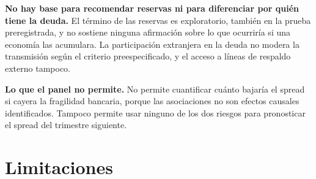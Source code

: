 \textbf{No hay base para recomendar reservas ni para diferenciar por quién tiene la deuda.} El término de las reservas es exploratorio, también en la prueba preregistrada, y no sostiene ninguna afirmación sobre lo que ocurriría si una economía las acumulara. La participación extranjera en la deuda no modera la transmisión según el criterio preespecificado, y el acceso a líneas de respaldo externo tampoco.

\textbf{Lo que el panel no permite.} No permite cuantificar cuánto bajaría el spread si cayera la fragilidad bancaria, porque las asociaciones no son efectos causales identificados. Tampoco permite usar ninguno de los dos riesgos para pronosticar el spread del trimestre siguiente.

\section{Limitaciones}

